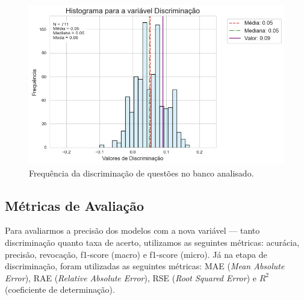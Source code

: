 \documentclass[12pt]{article}
\begin{document}
\begin{figure}
    \centering
    \includegraphics[width=0.90\linewidth]{Figures/discriminacao_freq.jpg}
    \caption{Frequência da discriminação de questões no banco analisado.}
    \label{fig:grafico_freq_discriminacao}
\end{figure}

\subsection{Métricas de Avaliação}
\label{sec:metricas_avaliacao}

Para avaliarmos a precisão dos modelos com a nova variável --- tanto discriminação quanto taxa de acerto, utilizamos as seguintes métricas: acurácia, precisão, revocação, f1-score (macro) e f1-score (micro). Já na etapa de discriminação, foram utilizadas as seguintes métricas: MAE (\textit{Mean Absolute Error}), RAE (\textit{Relative Absolute Error}), RSE (\textit{Root Squared Error}) e $R^2$ (coeficiente de determinação).
\end{document}
